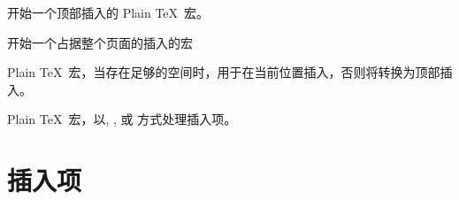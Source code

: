 \documentclass{book}
\begin{document}
\begin{inventory}
\item [\cs{topinsert}]
      开始一个顶部插入的 Plain \TeX\ 宏。


\item [\cs{pageinsert}]
      开始一个占据整个页面的插入的宏



\item [\cs{midinsert}]
      Plain \TeX\ 宏，当存在足够的空间时，用于在当前位置插入，否则将转换为顶部插入。



\item [\cs{endinsert}]
      Plain \TeX\ 宏，以, ,
      或  方式处理插入项。


\end{inventory}


\section{插入项}

\end{document}
